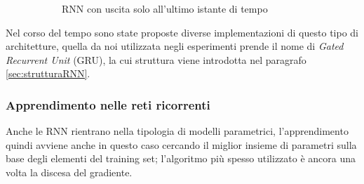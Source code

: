 \documentclass[../../main.tex]{subfiles}
\begin{document}
\begin{figure}[H]
\begin{subfigure}[t]{0.49\textwidth}
        \caption{RNN con uscita solo all'ultimo istante di tempo} 
        \label{fig:RNNArch3}  
    \end{subfigure}
    \caption{}
\end{figure}

Nel corso del tempo sono state proposte diverse implementazioni di questo tipo di architetture, quella da noi utilizzata negli esperimenti prende il nome di \textit{Gated Recurrent Unit} (GRU), la cui struttura viene introdotta nel paragrafo \ref{sec:strutturaRNN}.

\subsubsection{Apprendimento nelle reti ricorrenti}
Anche le RNN rientrano nella tipologia di modelli parametrici, l'apprendimento quindi avviene anche in questo caso cercando il miglior insieme di parametri sulla base degli elementi del training set; l'algoritmo più spesso utilizzato è ancora una volta la discesa del gradiente.
\end{document}
